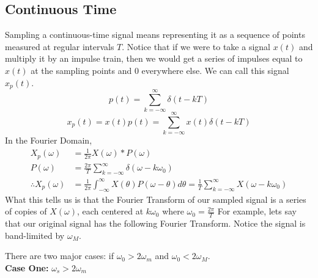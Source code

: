 \documentclass{article}
\begin{document}
\subsection{Continuous Time}
Sampling a continuous-time signal means representing it as a sequence of points measured at regular intervals $T$.
Notice that if we were to take a signal $x(t)$ and multiply it by an impulse train, then we would get a series of impulses
equal to $x(t)$ at the sampling points and $0$ everywhere else. We can call this signal $x_p(t)$.
$$p(t) = \sum_{k=-\infty}^{\infty}{\delta(t-kT)}$$
$$x_p(t) = x(t)p(t) = \sum_{k=-\infty}^{\infty}{x(t)\delta(t-kT)}$$
In the Fourier Domain,
\begin{align*}
    X_p(\omega) &= \frac{1}{2\pi}X(\omega)*P(\omega)\\
    P(\omega) &= \frac{2\pi}{T}\sum_{k=-\infty}^{\infty}{\delta(\omega-k\omega_0)}\\
    \therefore X_p(\omega) &= \frac{1}{2\pi}\int_{-\infty}^{\infty}{X(\theta)P(\omega-\theta)d\theta} = \frac{1}{T}\sum_{k=-\infty}^{\infty}{X(\omega-k\omega_0)}
\end{align*}
What this tells us is that the Fourier Transform of our sampled signal is a series of copies of $X(\omega)$, each centered
at $k\omega_0$ where $\omega_0 = \frac{2\pi}{T}$
For example, lets say that our original signal has the following Fourier Transform. Notice the signal is band-limited by $\omega_M$.
\begin{figure}[H]
    \centering
\end{figure}
There are two major cases: if $\omega_0 > 2\omega_m$ and $\omega_0 < 2\omega_M$.\\
\textbf{Case One: }$\omega_s > 2\omega_m$
\end{document}

